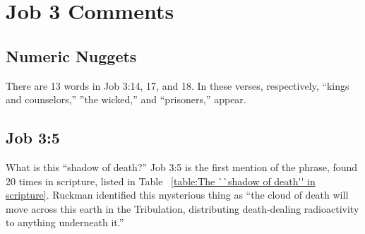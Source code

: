 \section{Job 3  Comments}

\subsection{Numeric Nuggets}
There are 13 words in Job 3:14, 17, and 18. In these verses, respectively, ``kings and counselors,'' ''the wicked,'' and ``prisoners,'' appear.

\subsection{Job 3:5}
What is this ``shadow of death?'' Job 3:5 is the first mention of the phrase, found 20 times in scripture, listed in Table ~\ref{table:The ``shadow of death'' in scripture}. Ruckman identified this mysterious thing as ``the cloud of death will move across this earth in the Tribulation, distributing death-dealing radioactivity to anything underneath it.''\cite{ruckman1993Job}


\normalsize
 
